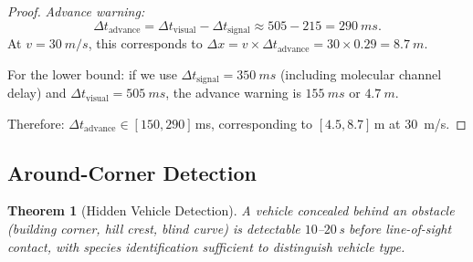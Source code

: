\documentclass[11pt,twocolumn,a4paper]{article}
\theoremstyle{plain}
\newtheorem{theorem}{Theorem}[section]
\theoremstyle{definition}
\theoremstyle{remark}
\begin{document}
\begin{proof}
\emph{Advance warning:}
\begin{equation}
\Delta t_{\mathrm{advance}} = \Delta t_{\mathrm{visual}} - \Delta t_{\mathrm{signal}} \approx 505 - 215 = \SI{290}{ms}.
\end{equation}
At $v = \SI{30}{m/s}$, this corresponds to $\Delta x = v \times \Delta t_{\mathrm{advance}} = 30 \times 0.29 = \SI{8.7}{m}$.

For the lower bound: if we use $\Delta t_{\mathrm{signal}} = \SI{350}{ms}$ (including molecular channel delay) and $\Delta t_{\mathrm{visual}} = \SI{505}{ms}$, the advance warning is $\SI{155}{ms}$ or $\SI{4.7}{m}$.

Therefore: $\Delta t_{\mathrm{advance}} \in [150, 290]$\,ms, corresponding to $[4.5, 8.7]$\,m at \SI{30}{m/s}.
\end{proof}

\subsection{Around-Corner Detection}

\begin{theorem}[Hidden Vehicle Detection]
\label{thm:around_corner}
A vehicle concealed behind an obstacle (building corner, hill crest, blind curve) is detectable $10$--$20$\,s before line-of-sight contact, with species identification sufficient to distinguish vehicle type.
\end{theorem}
\end{document}
